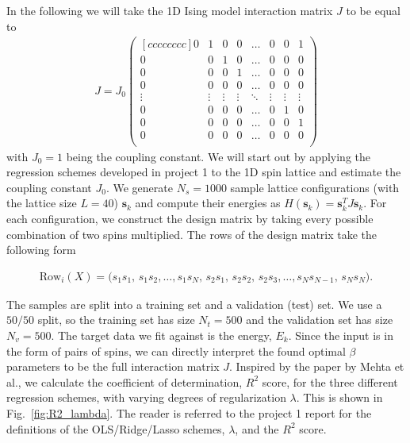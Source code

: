 \documentclass[a4paper, twocolumn]{article}
\newcommand{\fig}[1]{Fig.\ \ref{fig:#1}}
\newcommand{\pmat}[2]{\begin{pmatrix}[#1] #2 \end{pmatrix}}  %
\begin{document}
In the following we will take the 1D Ising model interaction matrix $J$ to be equal to
\begin{align}
J=J_0\pmat{cccccccc}{
  0 & 1 & 0 & 0 & \dots & 0 & 0 & 1 \\
  0 & 0 & 1 & 0 & \dots & 0 & 0 & 0 \\
  0 & 0 & 0 & 1 & \dots & 0 & 0 & 0 \\
  0 & 0 & 0 & 0 & \dots & 0 & 0 & 0 \\
  \vdots & \vdots & \vdots & \vdots & \ddots & \vdots & \vdots & \vdots \\
  0 & 0 & 0 & 0 & \dots & 0 & 1 & 0 \\
  0 & 0 & 0 & 0 & \dots & 0 & 0 & 1 \\
  0 & 0 & 0 & 0 & \dots & 0 & 0 & 0 \\
}
\end{align}
with $J_0=1$ being the coupling constant. We will start out by applying the regression schemes developed in project 1 to the 1D spin lattice and estimate the coupling constant $J_0$. We generate $N_s=1000$ sample lattice configurations (with the lattice size $L=40$) $\mathbf{s}_k$ and compute their energies as $H(\mathbf{s}_k)=\mathbf{s}_k^TJ\mathbf{s}_k$. For each configuration, we construct the design matrix by taking every possible combination of two spins multiplied. The rows of the design matrix take the following form
\begin{strip}
\begin{align}
\text{Row}_i(X) = \Big(s_1s_1, \,s_1s_2, \dots, s_1s_N,\, s_2s_1,\, s_2 s_2,\, s_2s_3, \dots, s_{N}s_{N-1},\, s_Ns_N \Big).
\end{align}
\end{strip}
The samples are split into a training set and a validation (test) set. We use a $50/50$ split, so the training set has size $N_t=500$ and the validation set has size $N_v=500$. The target data we fit against is the energy, $E_k$. Since the input is in the form of pairs of spins, we can directly interpret the found optimal $\beta$ parameters to be the full interaction matrix $J$. Inspired by the paper by Mehta et al.\autocite{mehta2018highbias}, we calculate the coefficient of determination, $R^2$ score, for the three different regression schemes, with varying degrees of regularization $\lambda$. This is shown in \fig{R2_lambda}. The reader is referred to the project 1 report for the definitions of the OLS/Ridge/Lasso schemes, $\lambda$, and the $R^2$ score.
\end{document}
